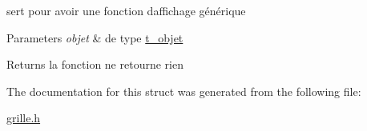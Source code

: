 sert pour avoir une fonction d\textquotesingle{}affichage générique 


\begin{DoxyParams}{Parameters}
{\em objet} & de type \hyperlink{structt__objet}{t\+\_\+objet} \\
\hline
\end{DoxyParams}
\begin{DoxyReturn}{Returns}
la fonction ne retourne rien 
\end{DoxyReturn}


The documentation for this struct was generated from the following file\+:\begin{DoxyCompactItemize}
\item 
\hyperlink{grille_8h}{grille.\+h}\end{DoxyCompactItemize}
